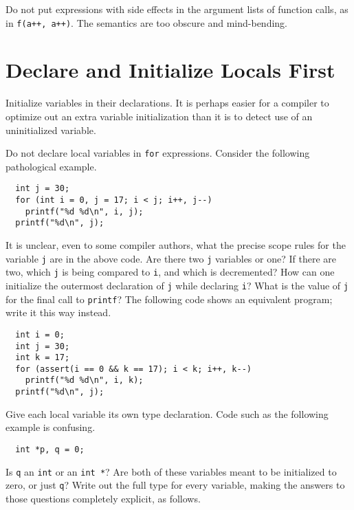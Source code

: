 \documentclass{lulu}
\newcommand{\code}[1]{\texttt{#1}\xspace}
\begin{document}
Do not put expressions with side effects in the argument lists of
function calls, as in \code{f(a++, a++)}.  The semantics are too
obscure and mind-bending.

\section{Declare and Initialize Locals First}

Initialize variables in their declarations.  It is perhaps easier for
a compiler to optimize out an extra variable initialization than it is
to detect use of an uninitialized variable.

Do not declare local variables in \code{for} expressions.  Consider
the following pathological example.

\begin{samepage}
\begin{verbatim}
  int j = 30;
  for (int i = 0, j = 17; i < j; i++, j--)
    printf("%d %d\n", i, j);
  printf("%d\n", j);
\end{verbatim}
\end{samepage}

It is unclear, even to some compiler authors, what the precise scope
rules for the variable \code{j} are in the above code.  Are there two
\code{j} variables or one?  If there are two, which \code{j} is being
compared to \code{i}, and which is decremented?  How can one
initialize the outermost declaration of \code{j} while declaring
\code{i}?  What is the value of \code{j} for the final call to
\code{printf}?  The following code shows an equivalent program; write
it this way instead.

\begin{samepage}
\begin{verbatim}
  int i = 0;
  int j = 30;
  int k = 17;
  for (assert(i == 0 && k == 17); i < k; i++, k--)
    printf("%d %d\n", i, k);
  printf("%d\n", j);
\end{verbatim}
\end{samepage}

Give each local variable its own type declaration.  Code such as the
following example is confusing.

\begin{samepage}
\begin{verbatim}
  int *p, q = 0;
\end{verbatim}
\end{samepage}

Is \code{q} an \code{int} or an \code{int *}?  Are both of these
variables meant to be initialized to zero, or just \code{q}?  Write
out the full type for every variable, making the answers to those
questions completely explicit, as follows.
\end{document}
